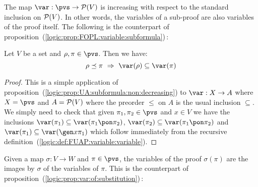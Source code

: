 The map $\var:\pvs\to{\cal P}(V)$ is increasing with respect to the
standard inclusion on ${\cal P}(V)$. In other words, the variables
of a sub-proof are also variables of the proof itself. The following
is the counterpart of
proposition~(\ref{logic:prop:FOPL:variable:subformula})\,:
\begin{prop}\label{logic:prop:FUAP:variable:subformula}
Let $V$ be a set and $\rho,\pi\in\pvs$. Then we have:
    \[
    \rho\preceq\pi\ \Rightarrow\ \var(\rho)\subseteq\var(\pi)
    \]
\end{prop}
\begin{proof}
This is a simple application of
proposition~(\ref{logic:prop:UA:subformula:non:decreasing}) to
$\var:X\to A$ where $X=\pvs$ and $A={\cal P}(V)$ where the preorder
$\leq$ on $A$ is the usual inclusion $\subseteq$. We simply need to
check that given $\pi_{1},\pi_{2}\in\pvs$ and $x\in V$ we have the
inclusions $\var(\pi_{1})\subseteq\var(\pi_{1}\pon\pi_{2})$,
$\var(\pi_{2})\subseteq\var(\pi_{1}\pon\pi_{2})$ and
$\var(\pi_{1})\subseteq\var(\gen x\pi_{1})$ which follow immediately
from the recursive
definition~(\ref{logic:def:FUAP:variable:variable}).
\end{proof}

Given a map $\sigma:V\to W$ and $\pi\in\pvs$, the variables of the
proof $\sigma(\pi)$ are the images by $\sigma$ of the variables of
$\pi$. This is the counterpart of
proposition~(\ref{logic:prop:var:of:substitution})\,:

